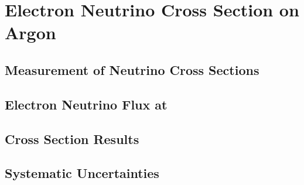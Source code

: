 \chapter{\label{chp:nue_xsec} Electron Neutrino Cross Section on Argon}

\section{Measurement of Neutrino Cross Sections}

\section{Electron Neutrino Flux at \argoneut}

\section{Cross Section Results}

\section{Systematic Uncertainties} 